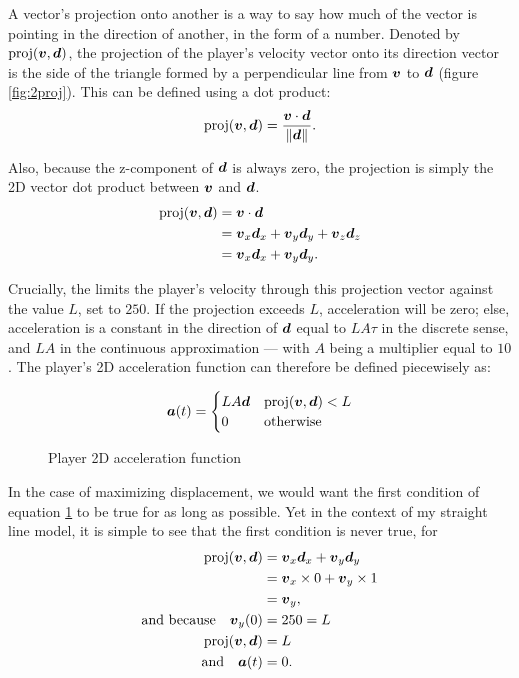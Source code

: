 A vector's projection onto another is a way to say how much of the vector is pointing in the direction of another, in the form of a number. Denoted by $\text{proj}(\boldsymbol{v}, \boldsymbol{d})$, the projection of the player's velocity vector onto its direction vector is the side of the triangle formed by a perpendicular line from $\boldsymbol{v}$ to $\boldsymbol{d}$ (figure \ref{fig:2proj}). This can be defined using a dot product:
\[
    \text{proj}(\boldsymbol{v}, \boldsymbol{d}) = \frac{\boldsymbol{v} \cdot \boldsymbol{d}}{\|\boldsymbol{d}\|}.
\]

Also, because the z-component of $\boldsymbol{d}$ is always zero, the projection is simply the 2D vector dot product between $\boldsymbol{v}$ and $\boldsymbol{d}$.
\begin{align*}
    \text{proj}(\boldsymbol{v}, \boldsymbol{d}) &= \boldsymbol{v} \cdot \boldsymbol{d}\\
    &= \boldsymbol{v}_x \boldsymbol{d}_x + \boldsymbol{v}_y \boldsymbol{d}_y + \boldsymbol{v}_z \boldsymbol{d}_z\\
    &= \boldsymbol{v}_x \boldsymbol{d}_x + \boldsymbol{v}_y \boldsymbol{d}_y.
\end{align*}

Crucially, the limits the player's velocity through this projection vector against the value $L$, set to $250$. If the projection exceeds $L$, acceleration will be zero; else, acceleration is a constant in the direction of $\boldsymbol{d}$ equal to $LA\tau$ in the discrete sense, and $LA$ in the continuous approximation --- with $A$ being a multiplier equal to $10$. The player's 2D acceleration function can therefore be defined piecewisely as:
\begin{figure}[H]
    \centering
    \[
        \boldsymbol{a}(t) = \begin{cases}
            LA \boldsymbol{d} & \text{proj}(\boldsymbol{v}, \boldsymbol{d}) < L\\
            0 & \text{otherwise}
        \end{cases}
    \]
        \caption{Player 2D acceleration function}
    \label{eq:playeracceleration}

\end{figure}

In the case of maximizing displacement, we would want the first condition of equation \ref{eq:playeracceleration} to be true for as long as possible. Yet in the context of my straight line model, it is simple to see that the first condition is never true, for
\begin{align*}
    \text{proj}(\boldsymbol{v}, \boldsymbol{d}) &= \boldsymbol{v}_x \boldsymbol{d}_x + \boldsymbol{v}_y \boldsymbol{d}_y\\
    &= \boldsymbol{v}_x \times 0 + \boldsymbol{v}_y \times 1\\
    &= \boldsymbol{v}_y,\\
    \text{and because} \quad \boldsymbol{v}_{y}(0) &= 250 = L\\
    \text{proj}(\boldsymbol{v}, \boldsymbol{d}) &= L\\
    \text{and} \quad \boldsymbol{a}(t) &= 0.
\end{align*}

